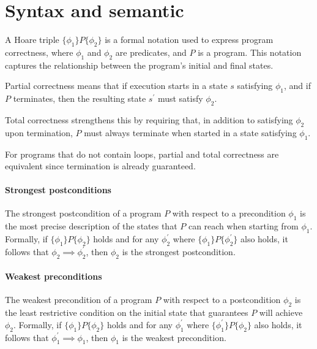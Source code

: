 \section{Syntax and semantic}

A Hoare triple $\{\phi_1\}P\{\phi_2\}$ is a formal notation used to express program correctness, where $\phi_1$ and $\phi_2$ are predicates, and $P$ is a program.
This notation captures the relationship between the program's initial and final states.

\begin{definition}
    Partial correctness means that if execution starts in a state $s$ satisfying $\phi_1$, and if $P$ terminates, then the resulting state $s^\prime$ must satisfy $\phi_2$.
\end{definition}

\begin{definition}
    Total correctness strengthens this by requiring that, in addition to satisfying $\phi_2$ upon termination, $P$ must always terminate when started in a state satisfying $\phi_1$.
\end{definition}
\noindent For programs that do not contain loops, partial and total correctness are equivalent since termination is already guaranteed.

\paragraph*{Strongest postconditions}
The strongest postcondition of a program $P$ with respect to a precondition $\phi_1$ is the most precise description of the states that $P$ can reach when starting from $\phi_1$. 
Formally, if $\{\phi_1\}P\{\phi_2\}$ holds and for any $\phi_2^\prime$ where $\{\phi_1\}P\{\phi_2^\prime\}$ also holds, it follows that $\phi_2\implies\phi_2^\prime$, then $\phi_2$ is the strongest postcondition.

\paragraph*{Weakest preconditions}
The weakest precondition of a program $P$ with respect to a postcondition $\phi_2$ is the least restrictive condition on the initial state that guarantees $P$ will achieve $\phi_2$.
Formally, if $\{\phi_1\}P\{\phi_2\}$ holds and for any $\phi_1^\prime$ where $\{\phi_1^\prime\}P\{\phi_2\}$ also holds, it follows that $\phi_1^\prime\implies\phi_1$, then $\phi_1$ is the weakest precondition.